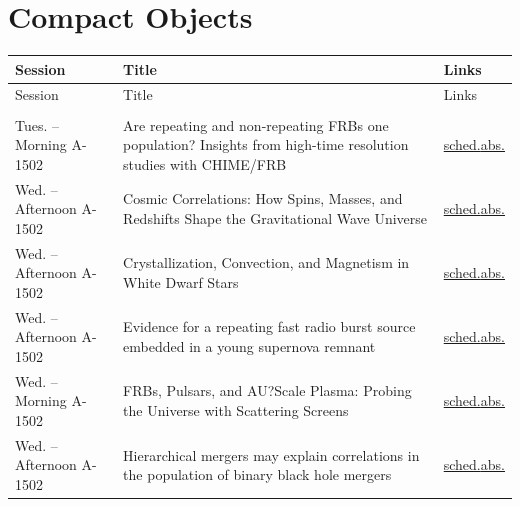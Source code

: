 \section*{Compact Objects}
{\small
\setlength{\emergencystretch}{1em}
\begin{longtable}{@{}>{\TableRaggedRight\arraybackslash\hspace{0pt}}p{} >{\TableRaggedRight\arraybackslash\hspace{0pt}}p{} >{\TableRaggedRight\arraybackslash\hspace{0pt}}p{}@{}}
\toprule
Session & Title & Links \\
\midrule
\endfirsthead
\toprule
Session & Title & Links \\
\midrule
\endhead
\addlinespace[0.15em]
\multicolumn{3}{@{}l}{\sffamily\bfseries\color{cascateal} Talks} \\
\addlinespace[0.1em]
Tues. -- Morning A-1502 & Are repeating and non-repeating FRBs one population? Insights from high-time resolution studies with CHIME/FRB & \hyperlink{schedule-talk-134}{sched.}\newline \hyperlink{abstract-talk-134}{abs.} \\
Wed. -- Afternoon A-1502 & Cosmic Correlations: How Spins, Masses, and Redshifts Shape the Gravitational Wave Universe & \hyperlink{schedule-talk-307}{sched.}\newline \hyperlink{abstract-talk-307}{abs.} \\
Wed. -- Afternoon A-1502 & Crystallization, Convection, and Magnetism in White Dwarf Stars & \hyperlink{schedule-talk-137}{sched.}\newline \hyperlink{abstract-talk-137}{abs.} \\
Wed. -- Afternoon A-1502 & Evidence for a repeating fast radio burst source embedded in a young supernova remnant & \hyperlink{schedule-talk-52}{sched.}\newline \hyperlink{abstract-talk-52}{abs.} \\
Wed. -- Morning A-1502 & FRBs, Pulsars, and AU?Scale Plasma: Probing the Universe with Scattering Screens & \hyperlink{schedule-talk-164}{sched.}\newline \hyperlink{abstract-talk-164}{abs.} \\
Wed. -- Afternoon A-1502 & Hierarchical mergers may explain correlations in the population of binary black hole mergers & \hyperlink{schedule-talk-262}{sched.}\newline \hyperlink{abstract-talk-262}{abs.} \\

\end{longtable}}
